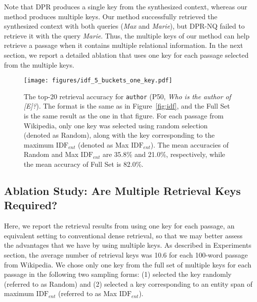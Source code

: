\documentclass[letterpaper]{article} \usepackage{aaai23}  \usepackage{times}  \usepackage{helvet}  \usepackage{courier}  \usepackage[hyphens]{url}  \usepackage{graphicx} \urlstyle{rm} \def\UrlFont{\rm}  \usepackage{natbib}  \usepackage{caption} \frenchspacing  \setlength{\pdfpagewidth}{8.5in}  \setlength{\pdfpageheight}{11in}  \usepackage{algorithm}
\begin{document}
Note that DPR produces a single key from the synthesized context, whereas our method produces multiple keys.
Our method successfully retrieved the synthesized context with both queries (\textit{Max} and \textit{Marie}), but DPR-NQ failed to retrieve it with the query \textit{Marie}.
Thus, the multiple keys of our method can help retrieve a passage when it contains multiple relational information.
In the next section, we report a detailed ablation that uses one key for each passage selected from the multiple keys.


\begin{figure}
	\centering
	\texttt{[image: figures/idf\_5\_buckets\_one\_key.pdf]}
	\caption{
		The top-20 retrieval accuracy for \texttt{\small author} (P50, \textit{Who is the author of [E]?}).
		The format is the same as in Figure~\ref{fig:idf},
		and the Full Set is the same result as the one in that figure.
		For each passage from Wikipedia, only one key was selected using random selection (denoted as Random), along with the key corresponding to the maximum $\mathrm{IDF}_{ent}$ (denoted as Max $\mathrm{IDF}_{ent}$).
		The mean accuracies of Random and Max $\mathrm{IDF}_{ent}$ are 35.8\% and 21.0\%, respectively, while the mean accuracy of Full Set is 82.0\%.
	}
	\label{fig:one_key}
\end{figure}


\subsection{Ablation Study: Are Multiple Retrieval Keys Required?}\label{sec:ablation_multiple_keys}
Here, we report the retrieval results from using one key for each passage, an equivalent setting to conventional dense retrieval, so that we may better assess the advantages that we have by using multiple keys.
As described in Experiments section, the average number of retrieval keys was 10.6 for each 100-word passage from Wikipedia.
We chose only one key from the full set of multiple keys for each passage in the following two sampling forms:
(1) selected the key randomly (referred to as Random) and (2) selected a key corresponding to an entity span of maximum $\mathrm{IDF}_{ent}$ (referred to as Max $\mathrm{IDF}_{ent}$).
\end{document}

